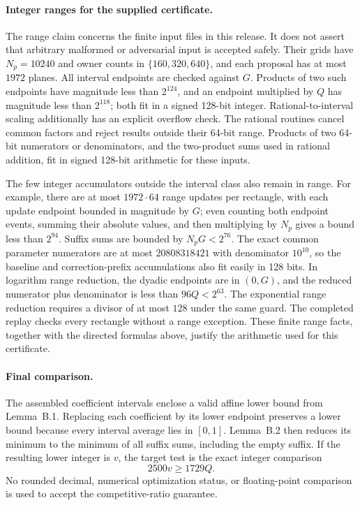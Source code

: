 \documentclass[11pt,a4paper]{article}
\begin{document}
\paragraph{Integer ranges for the supplied certificate.}
The range claim concerns the finite input files in this release.  It does
not assert that arbitrary malformed or adversarial input is accepted
safely.  Their grids have $N_p=10240$ and owner counts in
$\{160,320,640\}$, and each proposal has at most $1972$ planes.  All interval
endpoints are checked against $G$.  Products of two such endpoints have
magnitude less than $2^{124}$, and an endpoint multiplied by $Q$ has
magnitude less than $2^{118}$; both fit in a signed 128-bit integer.
Rational-to-interval scaling additionally has an explicit overflow check.
The rational routines cancel common factors and reject results outside
their 64-bit range.  Products of two 64-bit numerators or denominators,
and the two-product sums used in rational addition, fit in signed 128-bit
arithmetic for these inputs.

The few integer accumulators outside the interval class also remain in
range.  For example, there are at most $1972\cdot64$ range updates per
rectangle, with each update endpoint bounded in magnitude by $G$; even
counting both endpoint events, summing their absolute values, and then
multiplying by $N_p$ gives a bound less than $2^{94}$.  Suffix sums are
bounded by $N_pG<2^{76}$.  The exact common
parameter numerators are at most $20808318421$ with denominator $10^{10}$,
so the baseline and correction-prefix accumulations also fit easily in
128 bits.  In logarithm range reduction, the dyadic endpoints are in
$(0,G)$, and the reduced numerator plus denominator is less than
$96Q<2^{63}$.  The exponential range reduction requires a divisor of at
most $128$ under the same guard.  The completed replay checks every
rectangle without a range exception.  These finite range facts, together
with the directed formulas above, justify the arithmetic used for this
certificate.

\paragraph{Final comparison.}
The assembled coefficient intervals enclose a valid affine lower bound
from Lemma~B.1.  Replacing each coefficient by its lower endpoint preserves
a lower bound because every interval average lies in $[0,1]$.
Lemma~B.2 then reduces its minimum to the minimum of all suffix sums,
including the empty suffix.  If the resulting lower integer is $v$, the
target test is the exact integer comparison
\[
 2500v\ge1729Q.
\]
No rounded decimal, numerical optimization status, or floating-point
comparison is used to accept the competitive-ratio guarantee.
\end{document}
